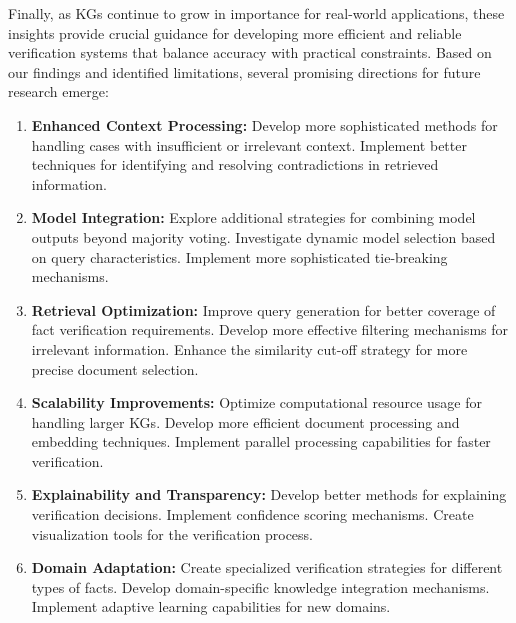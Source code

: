 Finally, as \acp{KG} continue to grow in importance for real-world applications, these insights provide crucial guidance for developing more efficient and reliable verification systems that balance accuracy with practical constraints.
Based on our findings and identified limitations, several promising directions for future research emerge:
\begin{enumerate}
    \item \textbf{Enhanced Context Processing:} Develop more sophisticated methods for handling cases with insufficient or irrelevant context. Implement better techniques for identifying and resolving contradictions in retrieved information.
    \item \textbf{Model Integration:} Explore additional strategies for combining model outputs beyond majority voting. Investigate dynamic model selection based on query characteristics. Implement more sophisticated tie-breaking mechanisms.
    \item \textbf{Retrieval Optimization:} Improve query generation for better coverage of fact verification requirements. Develop more effective filtering mechanisms for irrelevant information. Enhance the similarity cut-off strategy for more precise document selection.
    \item \textbf{Scalability Improvements:} Optimize computational resource usage for handling larger \acp{KG}. Develop more efficient document processing and embedding techniques. Implement parallel processing capabilities for faster verification.
    \item \textbf{Explainability and Transparency:} Develop better methods for explaining verification decisions. Implement confidence scoring mechanisms. Create visualization tools for the verification process.
    \item \textbf{Domain Adaptation:} Create specialized verification strategies for different types of facts. Develop domain-specific knowledge integration mechanisms. Implement adaptive learning capabilities for new domains.
\end{enumerate}